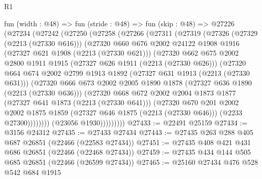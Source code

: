 \begin{lexlean}{R1}
\begin{coremodule}
    fun (width : @48) =>
    fun (stride : @48) =>
    fun (skip : @48) =>
    @27226
      (@27234
        (@27242
          (@27250
            (@27258
              (@27266
                (@27311
                  (@27319
                    (@27326
                      (@27329 (@2213 (@27330 @616)))
                      (@27320
                        @660
                        @676
                        @2002
                        @24122
                        @1908
                        @1916
                        (@27327 @621 @1908 (@2213 (@27330 @621)))
                        (@27320
                          @662
                          @675
                          @2002
                          @2800
                          @1911
                          @1915
                          (@27327 @626 @1911 (@2213 (@27330 @626)))
                          (@27320
                            @664
                            @674
                            @2002
                            @2799
                            @1913
                            @1892
                            (@27327 @631 @1913 (@2213 (@27330 @631)))
                            (@27320
                              @666
                              @673
                              @2002
                              @2005
                              @1890
                              @1878
                              (@27327 @636 @1890 (@2213 (@27330 @636)))
                              (@27320
                                @668
                                @672
                                @2002
                                @2004
                                @1873
                                @1877
                                (@27327 @641 @1873 (@2213 (@27330 @641)))
                                (@27320
                                  @670
                                  @201
                                  @2002
                                  @2002
                                  @1875
                                  @1859
                                  (@27327 @646 @1875 (@2213 (@27330 @646)))
                                  (@2233 @27300))))))))
                    (@23056 @1930)))))))))
@27433 := @22491 @25159
@27434 := @3156 @24312
@27435 := @27433 @27434
@27443 := @27435 @263 @288 @405 @687 @26851 (@22466 (@22583 @27434))
@27451 := @27435 @408 @421 @431 @686 @26851 (@22466 (@22468 @27434))
@27459 := @27435 @434 @144 @505 @685 @26851 (@22466 (@26599 @27434))
@27465 := @25160 @27434 @476 @528 @542 @684 @1915

\end{coremodule}
\end{lexlean}
